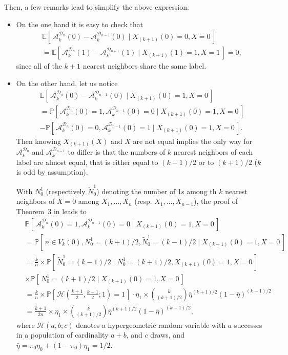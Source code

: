 \documentclass[twoside,11pt]{article}
\numberwithin{equation}{section}
\newcommand{\1}{\mathds{1}}%
\newcommand{\paren}[1]{\left( #1 \right)}
\newcommand{\croch}[1]{\left[\, #1 \,\right]}
\newcommand{\E}{\mathbb{E}}
\renewcommand{\P}{\mathbb{P}}
\newcommand{\D}{\mathcal{D}}
\newcommand{\Dn}{\mathcal{D}_n}
\newcommand{\A}{\mathcal{A}}
\numberwithin{equation}{section}
\theoremstyle{plain}
\begin{document}
	Then, a few remarks lead to simplify the above expression.
	\begin{itemize}
		\item On the one hand it is easy to check that
		\begin{align*}
		&\E\croch{ \A_k^{\Dn}(0) - \A_k^{\D_{n-1}}(0) \mid X_{(k+1)}(0)=0, X=0} \\ & =	\E\croch{ \A_k^{\Dn}(1) - \A_k^{\D_{n-1}}(1) \mid X_{(k+1)}(1)=1, X=1}  = 0 ,
		\end{align*}
		since all of the $k+1$ nearest neighbors share the same label.

		\item On the other hand, let us notice
		\begin{align*}
		&	\E\croch{ \A_k^{\Dn}(0) - \A_k^{\D_{n-1}}(0) \mid X_{(k+1)}(0)=1, X=0} \\
		& = \P\croch{ \A_k^{\Dn}(0)=1, \A_k^{\D_{n-1}}(0)=0 \mid   X_{(k+1)}(0)=1, X=0} \\
		& - \P\croch{ \A_k^{\Dn}(0)=0, \A_k^{\D_{n-1}}(0)=1 \mid   X_{(k+1)}(0)=1, X=0} .
		\end{align*}
		Then knowing $X_{(k+1)}(X)$ and $X$ are not equal implies the only way for $\A_k^{\Dn}$ and $\A_k^{\D_{n-1}}$ to differ is that the numbers of $k$ nearest neighbors of each label are almost equal, that is either equal to $(k-1)/2$ or to $(k+1)/2$ ($k$ is odd by assumption).

		With $N_0^1$ (respectively $\tilde N_0^1$) denoting the number of 1s among th $k$ nearest neighbors of $X=0$ among $X_1,\ldots,X_n$ (resp. $X_1,\ldots,X_{n-1}$), the proof of Theorem~3 in \cite{Chaudhuri_Dasgupta2014} leads to
		\begin{align*}
		& \P\croch{ \A_k^{\Dn}(0)=1, \A_k^{\D_{n-1}}(0)=0 \mid   X_{(k+1)}(0)=1, X=0} \\
		& = \P\croch{  n \in V_k(0), N_0^1 = (k+1)/2, \tilde N_0^1 = (k-1)/2 \mid   X_{(k+1)}(0)=1, X=0} \\
		& = \frac{k}{n}  \times \P\croch{ \tilde N_0^1 = (k-1)/2 \mid  N_0^1 = (k+1)/2,  X_{(k+1)}(0)=1, X=0} \\
		& \times \P\croch{ N_0^1 = (k+1)/2  \mid   X_{(k+1)}(0)=1, X=0} \\
		& = \frac{k}{n} \times \P\croch{\mathcal{H}\paren{ \frac{k+1}{2},\frac{k-1}{2};1}=1 } \cdot \eta_1 \times {k \choose (k+1)/2} \bar\eta^{(k+1)/2}\paren{1- \bar{\eta}}^{(k-1)/2} \\
		& = \frac{k+1}{2n} \times  \eta_1 \times {k \choose (k+1)/2} \bar\eta^{(k+1)/2}\paren{1- \bar{\eta}}^{(k-1)/2} ,
		\end{align*}
		where $\mathcal{H}(a,b;c)$ denotes a hypergeometric random variable with $a$ successes in a population of cardinality $a+b$, and $c$ draws, and $\bar \eta = \pi_0 \eta_0 + (1-\pi_0) \eta_1 = 1/2$.


\end{itemize}
\end{document}
